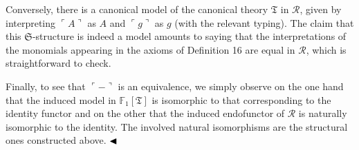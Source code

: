  
 
Conversely, there is a canonical model of the canonical theory $\mathfrak{T}$ in $\mathcal{R}$, given by interpreting $\ulcorner A\urcorner$ as $A$ and $\ulcorner g\urcorner$ as $g$ (with the relevant typing). The claim that this $\mathfrak{S}$-structure is indeed a model amounts to saying that the interpretations of the monomials appearing in the axioms of Definition 16 are equal in $\mathcal{R}$, which is straightforward to check.\par
 
 
 
Finally, to see that $\ulcorner-\urcorner$ is an equivalence, we simply observe on the one hand that the induced model in $\mathbb{F}_{1}[\mathfrak{T}]$ is isomorphic to that corresponding to the identity functor and on the other that the induced endofunctor of $\mathcal{R}$ is naturally isomorphic to the identity. The involved natural isomorphisms are the structural ones constructed above. $\hfill\blacktriangleleft$\par
 
 
 

